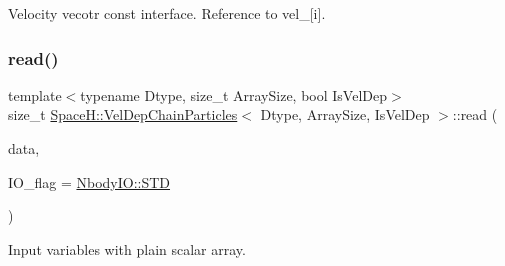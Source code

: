 Velocity vecotr const interface. Reference to vel\+\_\+\mbox{[}i\mbox{]}. 

\mbox{\label{class_space_h_1_1_vel_dep_chain_particles_a901445956f76ea38574b2df3c45c77a1}} 
\subsubsection{\texorpdfstring{read()}{read()}\hspace{0.1cm}{\footnotesize\ttfamily [1/2]}}
{\footnotesize\ttfamily template$<$typename Dtype, size\+\_\+t Array\+Size, bool Is\+Vel\+Dep$>$ \\
size\+\_\+t \mbox{\hyperlink{class_space_h_1_1_vel_dep_chain_particles}{Space\+H\+::\+Vel\+Dep\+Chain\+Particles}}$<$ Dtype, Array\+Size, Is\+Vel\+Dep $>$\+::read (\begin{DoxyParamCaption}\item[{const \mbox{\hyperlink{class_space_h_1_1_vel_indep_particles_abca40159a816385790d5a6fd19c1dc6d}{Scalar\+Buffer}} \&}]{data,  }\item[{const \mbox{\hyperlink{namespace_space_h_a296a8bae763a754564bfdce216e31b59}{Nbody\+IO}}}]{I\+O\+\_\+flag = {\ttfamily \mbox{\hyperlink{namespace_space_h_a296a8bae763a754564bfdce216e31b59ac6ce23be5d350ce18a665427d2d950f7}{Nbody\+I\+O\+::\+S\+TD}}} }\end{DoxyParamCaption})\hspace{0.3cm}{\ttfamily [inline]}}



Input variables with plain scalar array. 

\mbox{\label{class_space_h_1_1_vel_dep_chain_particles_a901445956f76ea38574b2df3c45c77a1}} 
